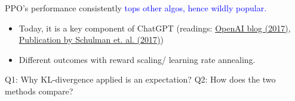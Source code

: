 \documentclass{article}
\begin{document}
PPO's performance consistently \textcolor{blue}{tops other algos, hence wildly popular.}
\begin{itemize}
\item Today, it is a key component of ChatGPT (readings: \href{https://openai.com/index/openai-baselines-ppo/}{OpenAI blog (2017)}, \href{https://arxiv.org/pdf/1707.06347}{Publication by Schulman et. al. (2017)})
\item Different outcomes with reward scaling/ learning rate annealing.
\end{itemize}



\begin{hintbox}
    Q1: Why KL-divergence applied is an expectation?
    Q2: How does the two methods compare?
\end{hintbox}
\end{document}
